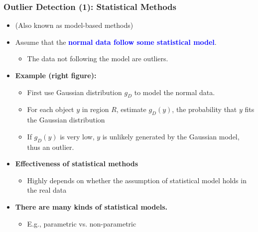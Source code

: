 \documentclass[aspectratio=169,t,xcolor=dvipsnames]{beamer}
\newcommand{\blue}[1]{\textbf{\textcolor{blue}{#1}}}
\begin{document}
\begin{frame}
	\frametitle{Outlier Detection (1): Statistical Methods}
	\begin{itemize}
		\item (Also known as model-based methods)
		\item Assume that the \blue{normal data follow some statistical model}.
		      \begin{itemize}
		      	\item The data not following the model are outliers.
		      \end{itemize}
		\item \textbf{Example (right figure):}
		      \begin{itemize}
		      	\item First use Gaussian distribution \alert{$g_D$} to model the normal data.
		      	\item For each object \alert{$y$} in region \alert{$R$}, estimate $g_D(y)$, the probability that $y$ fits\\ the Gaussian distribution
		      	\item If $g_D(y)$ is very low, $y$ is unlikely generated by the Gaussian model, thus an outlier.
		      \end{itemize}
		\item\textbf{ Effectiveness of statistical methods}
		      \begin{itemize}
		      	\item Highly depends on whether the assumption of statistical model holds in the real data
		      \end{itemize}
		\item \textbf{There are many kinds of statistical models.}
		      \begin{itemize}
		      	\item E.g., parametric vs. non-parametric
		      \end{itemize}
	\end{itemize}
	

\end{frame}
\end{document}
